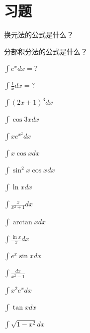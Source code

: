 \section{习题}
\begin{exercise}[0] 换元法的公式是什么？\end{exercise}
\begin{exercise}[0] 分部积分法的公式是什么？\end{exercise}
\begin{exercise}[0] \(\int e^x dx = ?\)\end{exercise}
\begin{exercise}[0] \(\int \frac1x dx = ?\)\end{exercise}
\begin{exercise}[1] \(\int (2x+1)^3 dx\)\end{exercise}
\begin{exercise}[1] \(\int \cos 3x dx\)\end{exercise}
\begin{exercise}[1] \(\int xe^{x^2} dx\)\end{exercise}
\begin{exercise}[1] \(\int x\cos x dx\)\end{exercise}
\begin{exercise}[2] \(\int \sin^2 x \cos x dx\)\end{exercise}
\begin{exercise}[2] \(\int \ln x dx\)\end{exercise}
\begin{exercise}[2] \(\int \frac{x}{x^2+1} dx\)\end{exercise}
\begin{exercise}[2] \(\int \arctan x dx\)\end{exercise}
\begin{exercise}[3] \(\int \frac{\ln x}{x} dx\)\end{exercise}
\begin{exercise}[3] \(\int e^x \sin x dx\)\end{exercise}
\begin{exercise}[3] \(\int \frac{dx}{x^2-1}\)\end{exercise}
\begin{exercise}[3] \(\int x^2 e^x dx\)\end{exercise}
\begin{exercise}[3] \(\int \tan x dx\)\end{exercise}
\begin{exercise}[4] \(\int \sqrt{1-x^2} dx\)\end{exercise}
